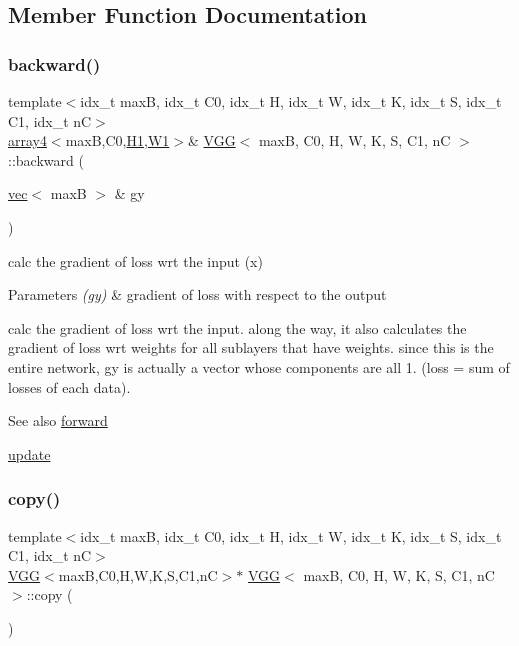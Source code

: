 \subsection{Member Function Documentation}
\mbox{\label{structVGG_ad6c413558605836d7cffa87dc2971628}} 
\subsubsection{\texorpdfstring{backward()}{backward()}}
{\footnotesize\ttfamily template$<$idx\+\_\+t maxB, idx\+\_\+t C0, idx\+\_\+t H, idx\+\_\+t W, idx\+\_\+t K, idx\+\_\+t S, idx\+\_\+t C1, idx\+\_\+t nC$>$ \\
\hyperlink{structarray4}{array4}$<$maxB,C0,\hyperlink{structVGG_a73f189c70eef33b8e8de32929db37b10}{H1},\hyperlink{structVGG_a01305ab6d90c95eb50c45352203b07e0}{W1}$>$\& \hyperlink{structVGG}{V\+GG}$<$ maxB, C0, H, W, K, S, C1, nC $>$\+::backward (\begin{DoxyParamCaption}\item[{\hyperlink{structvec}{vec}$<$ maxB $>$ \&}]{gy }\end{DoxyParamCaption})\hspace{0.3cm}{\ttfamily [inline]}}



calc the gradient of loss wrt the input (x) 


\begin{DoxyParams}{Parameters}
{\em (gy)} & gradient of loss with respect to the output\\
\hline
\end{DoxyParams}
calc the gradient of loss wrt the input. along the way, it also calculates the gradient of loss wrt weights for all sublayers that have weights. since this is the entire network, gy is actually a vector whose components are all 1. (loss = sum of losses of each data). \begin{DoxySeeAlso}{See also}
\hyperlink{structVGG_a256a1792818900ab2023554cea1ebb31}{forward} 

\hyperlink{structVGG_a1adaccb289e6577317b49df5e1f3b465}{update} 
\end{DoxySeeAlso}
\mbox{\label{structVGG_a671e3b02b9a8e55c274f7863a116af30}} 
\subsubsection{\texorpdfstring{copy()}{copy()}}
{\footnotesize\ttfamily template$<$idx\+\_\+t maxB, idx\+\_\+t C0, idx\+\_\+t H, idx\+\_\+t W, idx\+\_\+t K, idx\+\_\+t S, idx\+\_\+t C1, idx\+\_\+t nC$>$ \\
\hyperlink{structVGG}{V\+GG}$<$maxB,C0,H,W,K,S,C1,nC$>$$\ast$ \hyperlink{structVGG}{V\+GG}$<$ maxB, C0, H, W, K, S, C1, nC $>$\+::copy (\begin{DoxyParamCaption}{ }\end{DoxyParamCaption})\hspace{0.3cm}{\ttfamily [inline]}}



